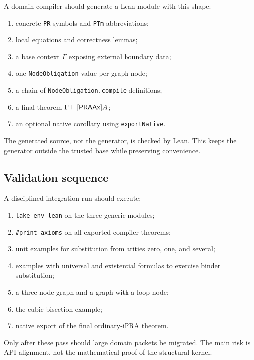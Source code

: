 A domain compiler should generate a Lean module with this shape:
\begin{enumerate}
  \item concrete \texttt{PR} symbols and \texttt{PTm} abbreviations;
  \item local equations and correctness lemmas;
  \item a base context \(\Gamma\) exposing external boundary data;
  \item one \texttt{NodeObligation} value per graph node;
  \item a chain of \texttt{NodeObligation.compile} definitions;
  \item a final theorem \(\Gamma\vdash[\mathsf{PRAAx}]A\);
  \item an optional native corollary using \texttt{exportNative}.
\end{enumerate}
The generated source, not the generator, is checked by Lean.  This keeps the generator outside the trusted
base while preserving convenience.

\subsection{Validation sequence}

A disciplined integration run should execute:
\begin{enumerate}
  \item \texttt{lake env lean} on the three generic modules;
  \item \texttt{\#print axioms} on all exported compiler theorems;
  \item unit examples for substitution from arities zero, one, and several;
  \item examples with universal and existential formulas to exercise binder substitution;
  \item a three-node graph and a graph with a loop node;
  \item the cubic-bisection example;
  \item native export of the final ordinary-iPRA theorem.
\end{enumerate}
Only after these pass should large domain packets be migrated.  The main risk is API alignment, not the
mathematical proof of the structural kernel.
